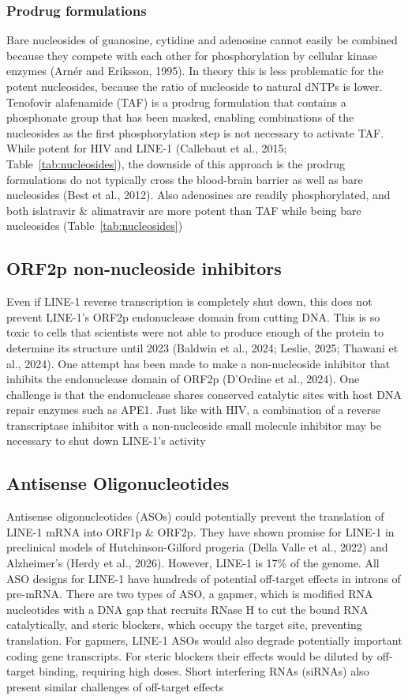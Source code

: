 \documentclass[11pt,twocolumn,twoside]{extarticle}
\begin{document}
\subsubsection{Prodrug formulations}
Bare nucleosides of guanosine, cytidine and adenosine cannot easily be combined because they compete with each other for phosphorylation by cellular kinase enzymes (Arn\'er and Eriksson, 1995). In theory this is less problematic for the potent nucleosides, because the ratio of nucleoside to natural dNTPs is lower. Tenofovir alafenamide (TAF) is a prodrug formulation that contains a phosphonate group that has been masked, enabling combinations of the nucleosides as the first phosphorylation step is not necessary to activate TAF. While potent for HIV and LINE-1 (Callebaut et al., 2015; Table~\ref{tab:nucleosides}), the downside of this approach is the prodrug formulations do not typically cross the blood-brain barrier as well as bare nucleosides (Best et al., 2012). Also adenosines are readily phosphorylated, and both islatravir \& alimatravir are more potent than TAF while being bare nucleosides (Table~\ref{tab:nucleosides})

\subsection{ORF2p non-nucleoside inhibitors}
Even if LINE-1 reverse transcription is completely shut down, this does not prevent LINE-1's ORF2p endonuclease domain from cutting DNA. This is so toxic to cells that scientists were not able to produce enough of the protein to determine its structure until 2023 (Baldwin et al., 2024; Leslie, 2025; Thawani et al., 2024). One attempt has been made to make a non-nucleoside inhibitor that inhibits the endonuclease domain of ORF2p (D'Ordine et al., 2024). One challenge is that the endonuclease shares conserved catalytic sites with host DNA repair enzymes such as APE1. Just like with HIV, a combination of a reverse transcriptase inhibitor with a non-nucleoside small molecule inhibitor may be necessary to shut down LINE-1's activity

\subsection{Antisense Oligonucleotides}
Antisense oligonucleotides (ASOs) could potentially prevent the translation of LINE-1 mRNA into ORF1p \& ORF2p. They have shown promise for LINE-1 in preclinical models of Hutchinson-Gilford progeria (Della Valle et al., 2022) and Alzheimer's (Herdy et al., 2026). However, LINE-1 is 17\% of the genome. All ASO designs for LINE-1 have hundreds of potential off-target effects in introns of pre-mRNA. There are two types of ASO, a gapmer, which is modified RNA nucleotides with a DNA gap that recruits RNase H to cut the bound RNA catalytically, and steric blockers, which occupy the target site, preventing translation. For gapmers, LINE-1 ASOs would also degrade potentially important coding gene transcripts. For steric blockers their effects would be diluted by off-target binding, requiring high doses. Short interfering RNAs (siRNAs) also present similar challenges of off-target effects
\end{document}
